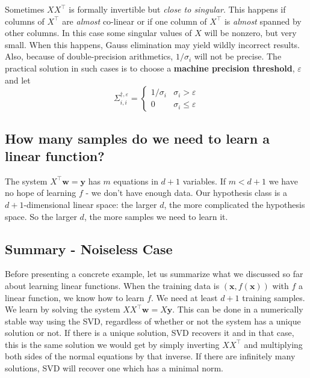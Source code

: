 \documentclass[11pt]{article}
\newcommand{\Tr}{\ensuremath{\top}}
\begin{document}
Sometimes $XX^\Tr$ is formally invertible but \textit{close to singular}. This happens if columns of $X^\Tr$ are \textit{almost} co-linear or if one column of $X^\Tr$ is \textit{almost} spanned by other columns. In this case some singular values of $X$ will be nonzero, but very small. When this happens, Gauss elimination may yield wildly incorrect results. Also, because of double-precision arithmetics, $1/\sigma_i$ will not be precise. The practical solution in such cases is to choose a \textbf{machine precision threshold}, $\varepsilon$ and let
\[
  \Sigma^{\dagger,\varepsilon}_{i,i} =
                           \begin{cases}
                             1/\sigma_i & \sigma_i>\varepsilon\\
                             0 & \sigma_i \leq \varepsilon
                           \end{cases}
                         \]




\subsection{How many samples do we need to learn a linear function?}
The system $X^\Tr \mathbf{w}=\mathbf{y}$ has $m$ equations in $d+1$ variables. If $m<d+1$ we have no hope of learning $f$ - we don't have enough data.
Our hypothesis class is a $d+1$-dimensional linear space: the larger $d$, the more complicated the hypothesis space. So the larger $d$, the more samples we need to learn it.


\subsection{Summary - Noiseless Case}
Before presenting a concrete example, let us summarize what we discussed so far about learning linear functions. When the training data is $(\mathbf{x},f(\mathbf{x}))$ with $f$ a linear function, we know how to learn $f$. We need at least $d+1$ training samples. We learn by solving the system $XX^\Tr \mathbf{w}=X\mathbf{y}$. This can be done in a numerically stable way using the SVD, regardless of whether or not the system has a unique solution or not.
If there is a unique solution, SVD recovers it and in that case, this is the same solution we would get by simply inverting $XX^\Tr$ and multiplying both sides of the normal equations by that inverse.
If there are infinitely many solutions, SVD will recover one which has a minimal norm.
\end{document}
